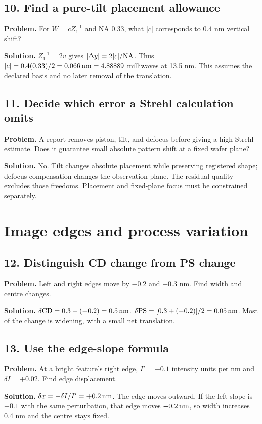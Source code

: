 \subsection*{10. Find a pure-tilt placement allowance}
\textbf{Problem.} For $W=cZ_1^{-1}$ and NA 0.33, what $|c|$
corresponds to 0.4 nm vertical shift?

\textbf{Solution.}
$Z_1^{-1}=2v$ gives $|\Delta y|=2|c|/\mathrm{NA}$.
Thus $|c|=0.4(0.33)/2=0.066\,\mathrm{nm}=4.88889$ milliwaves at 13.5 nm.
This assumes the declared basis and no later removal of the translation.

\subsection*{11. Decide which error a Strehl calculation omits}
\textbf{Problem.} A report removes piston, tilt, and defocus before giving
a high Strehl estimate. Does it guarantee small absolute pattern shift
at a fixed wafer plane?

\textbf{Solution.}
No. Tilt changes absolute placement while preserving registered shape;
defocus compensation changes the observation plane.
The residual quality excludes those freedoms. Placement and fixed-plane
focus must be constrained separately.

\section{Image edges and process variation}
\subsection*{12. Distinguish CD change from PS change}
\textbf{Problem.} Left and right edges move by $-0.2$ and $+0.3$ nm.
Find width and centre changes.

\textbf{Solution.}
$\delta\mathrm{CD}=0.3-(-0.2)=0.5\,\mathrm{nm}$.
$\delta\mathrm{PS}=[0.3+(-0.2)]/2=0.05\,\mathrm{nm}$.
Most of the change is widening, with a small net translation.

\subsection*{13. Use the edge-slope formula}
\textbf{Problem.} At a bright feature's right edge, $I'=-0.1$ intensity
units per nm and $\delta I=+0.02$. Find edge displacement.

\textbf{Solution.}
$\delta x=-\delta I/I'=+0.2\,\mathrm{nm}$.
The edge moves outward. If the left slope is $+0.1$ with the same
perturbation, that edge moves $-0.2\,\mathrm{nm}$, so width increases 0.4 nm
and the centre stays fixed.

